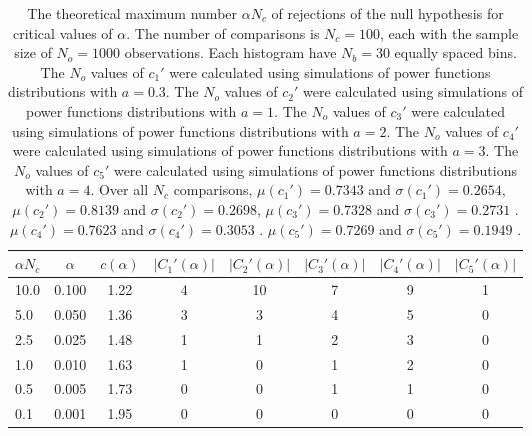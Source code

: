 \begin{table}[h!]
\begin{center}
\begin{tabular}{| l | c | c | c | c | c | c | c |}\hline
$\alpha N_c$ & $\alpha$ & $c(\alpha)$ & $|C_1'(\alpha)|$ & $|C_2'(\alpha)|$ & $|C_3'(\alpha)|$ & $|C_4'(\alpha)|$ & $|C_5'(\alpha)|$ \\\hline
10.0 & 0.100 & 1.22 & 4 & 10 & 7 & 9 & 1 \\\hline
5.0 & 0.050 & 1.36 & 3 & 3 & 4 & 5 & 0 \\\hline
2.5 & 0.025 & 1.48 & 1 & 1 & 2 & 3 & 0 \\\hline
1.0 & 0.010 & 1.63 & 1 & 0 & 1 & 2 & 0 \\\hline
0.5 & 0.005 & 1.73 & 0 & 0 & 1 & 1 & 0 \\\hline
0.1 & 0.001 & 1.95 & 0 & 0 & 0 & 0 & 0 \\\hline
\end{tabular}
\caption{The theoretical maximum number $\alpha N_c$ of rejections
of the null hypothesis for critical values of $\alpha$.
The number of comparisons is $N_c=100$,
each with the sample size of $N_o=1000$ observations.
Each histogram have $N_b=30$ equally spaced bins.
The $N_o$ values of $c_1'$ were calculated using simulations of
 power functions distributions with $a=0.3$.
The $N_o$ values of $c_2'$ were calculated using simulations of
 power functions distributions with $a=1$.
The $N_o$ values of $c_3'$ were calculated using simulations of
 power functions distributions with $a=2$.
The $N_o$ values of $c_4'$ were calculated using simulations of
 power functions distributions with $a=3$.
The $N_o$ values of $c_5'$ were calculated using simulations of
 power functions distributions with $a=4$.
Over all $N_c$ comparisons,
 $\mu(c_1')=0.7343$ and $\sigma(c_1')=0.2654$,
 $\mu(c_2')=0.8139$ and $\sigma(c_2')=0.2698$,
 $\mu(c_3')=0.7328$ and $\sigma(c_3')=0.2731$ .
 $\mu(c_4')=0.7623$ and $\sigma(c_4')=0.3053$ .
 $\mu(c_5')=0.7269$ and $\sigma(c_5')=0.1949$ .
}
\end{center}
\end{table}
